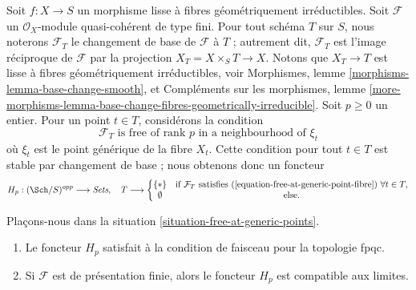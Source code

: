 \begin{situation}
\label{situation-free-at-generic-points}
Soit $f : X \to S$ un morphisme lisse à fibres géométriquement
irréductibles. Soit $\mathcal{F}$ un $\mathcal{O}_X$-module quasi-cohérent de
type fini. Pour tout schéma $T$ sur $S$, nous noterons
$\mathcal{F}_T$ le changement de base de $\mathcal{F}$ à $T$ ; autrement
dit, $\mathcal{F}_T$ est l'image réciproque de $\mathcal{F}$ par la
projection $X_T = X \times_S T \to X$. Notons que $X_T \to T$
est lisse à fibres géométriquement irréductibles, voir
Morphismes, lemme \ref{morphisms-lemma-base-change-smooth}, et
Compléments sur les morphismes,
lemme \ref{more-morphisms-lemma-base-change-fibres-geometrically-irreducible}.
Soit $p \geq 0$ un entier. Pour un point $t \in T$, considérons la
condition
\begin{equation}
\label{equation-free-at-generic-point-fibre}
\mathcal{F}_T \text{ is free of rank }p\text{ in a neighbourhood of }\xi_t
\end{equation}
où $\xi_t$ est le point générique de la fibre $X_t$. Cette condition
pour tout $t \in T$ est stable par changement de base ; nous obtenons donc un foncteur
\begin{equation}
\label{equation-free-at-generic-points}
H_p : (\Sch/S)^{opp} \longrightarrow \textit{Sets}, \quad
T \longrightarrow \left\{
\begin{matrix}
\{*\} & \text{if }\mathcal{F}_T\text{ satisfies
(\ref{equation-free-at-generic-point-fibre}) }\forall t\in T, \\
\emptyset & \text{else.}
\end{matrix}
\right.
\end{equation}
\end{situation}

\begin{lemma}
\label{lemma-free-at-generic-points}
Plaçons-nous dans la situation \ref{situation-free-at-generic-points}.
\begin{enumerate}
\item Le foncteur $H_p$ satisfait à la condition de faisceau pour la topologie fpqc.
\item Si $\mathcal{F}$ est de présentation finie, alors le foncteur $H_p$ est
compatible aux limites.
\end{enumerate}
\end{lemma}

